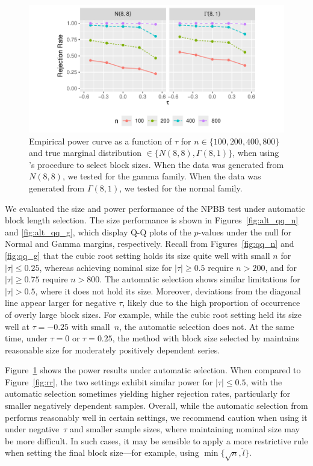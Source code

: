 \documentclass[12pt]{article}
\begin{document}
\begin{figure}[tbp]
  \centering
  \includegraphics[scale=1]{figures/alt_rr}
  \caption{Empirical power curve as a function of $\tau$ for
    $n \in \{100, 200, 400, 800\}$ and true marginal distribution
    $\in \{N(8,8), \Gamma(8,1)\}$, when using \citet{politis2004automatic}'s 
    procedure
    to select block sizes. When the data was generated from $N(8,8)$,
    we tested for the gamma family. When the data was generated from
    $\Gamma(8,1)$, we tested for the normal family.
  }
  \label{fig:alt_rr}
\end{figure}


We evaluated the size and power performance of the NPBB test under automatic
block length selection. The size performance is shown
in Figures~\ref{fig:alt_qq_n} and \ref{fig:alt_qq_g}, which display Q-Q plots
of the $p$-values under the null for Normal and Gamma margins, respectively.
Recall from Figures~\ref{fig:qq_n} and \ref{fig:qq_g} that the cubic root 
setting holds its size quite well with small $n$ for $|\tau| \leq 0.25$,
whereas achieving nominal size for $|\tau| \geq 0.5$ require
$n > 200$, and for $|\tau| \geq 0.75$ require $n > 800$. The automatic
selection shows similar limitations for $|\tau| > 0.5$, where it does
not hold its size. Moreover, deviations from the diagonal line appear
larger for negative $\tau$, likely due to the high proportion of
occurrence of overly large block sizes. For example, while the cubic
root setting held its size well at $\tau = -0.25$ with small~$n$, the
automatic selection does not. At the same time, under $\tau = 0$ or
$\tau = 0.25$, the method with block size selected by
\citep{politis2004automatic} maintains reasonable size for moderately
positively dependent series.


Figure~\ref{fig:alt_rr} shows the power results under automatic selection.
When compared to Figure~\ref{fig:rr}, the two settings exhibit similar power
for $|\tau| \leq 0.5$, with the automatic selection sometimes yielding higher
rejection rates, particularly for smaller negatively dependent samples.
Overall, while the automatic selection from \citep{politis2004automatic}
performs reasonably well in certain settings, we recommend caution when using
it under negative~$\tau$ and smaller sample sizes, where maintaining nominal
size may be more difficult. In such cases, it may be sensible to apply a more
restrictive rule when setting the final block size---for example, using
$\min \{\sqrt{n}, \hat{l}\}$.
\end{document}
